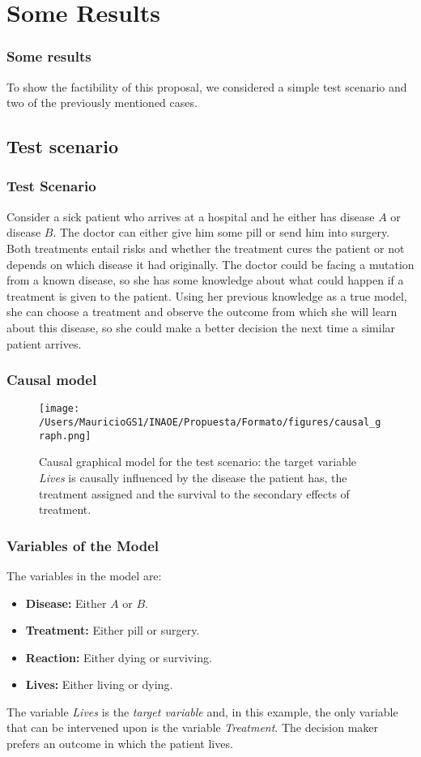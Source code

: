 \documentclass{beamer}
\theoremstyle{plain}
\begin{document}
\section{Some Results}
\begin{frame}
\frametitle{Some results}
To show the factibility of this proposal, we considered a simple test scenario and two of the previously mentioned cases.
\end{frame}
\subsection{Test scenario}
\begin{frame}
\frametitle{Test Scenario}
Consider a sick patient who arrives at a hospital and he either has disease $A$ or disease $B$. The doctor can either give him some pill or send him into surgery.  Both treatments entail risks and whether the treatment cures the patient or not depends on which disease it had originally. The doctor could be facing a mutation from a known disease, so she has some knowledge about what could happen if a treatment is given to the patient. Using her previous knowledge as a true model, she can choose a treatment and observe the outcome from which she will learn about this disease, so she could make a better decision the next time a similar patient arrives.
\end{frame}

\begin{frame}
\frametitle{Causal model}
\begin{figure}[ht]
\vskip 0.2in
\begin{center}
\centerline{\texttt{[image: /Users/MauricioGS1/INAOE/Propuesta/Formato/figures/causal\_graph.png]}}
\caption{Causal graphical model for the test scenario: the target variable \textit{Lives} is causally influenced by the disease the patient has, the treatment assigned and the survival to the secondary effects of treatment.}
\label{causal_model}
\end{center}
\vskip -0.2in
\end{figure}
\end{frame}

\begin{frame}
\frametitle{Variables of the Model}
The variables in the model are: 
\begin{itemize}
\item \textbf{Disease:} Either $A$ or $B$.
\item \textbf{Treatment:} Either pill or surgery.
\item \textbf{Reaction:} Either dying or surviving.
\item \textbf{Lives:} Either living or dying.
\end{itemize}
The variable \textit{Lives} is the \textit{target variable} and, in this example, the only variable that can be intervened upon is the variable \textit{Treatment}. The decision maker prefers an outcome in which the patient lives.
\end{frame}
\end{document}
